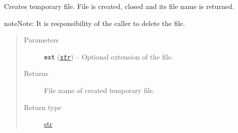 \documentclass[a4paper,10pt,english]{sphinxmanual}
\begin{document}
\begin{fulllineitems}
\label{aqueduct.utils.helpers:aqueduct.utils.helpers.create_tmpfile}
Creates temporary file. File is created, closed and its file name is returned.

\begin{notice}{note}{Note:}
It is responsibility of the caller to delete the file.
\end{notice}
\begin{quote}\begin{description}
\item[{Parameters}] \leavevmode
\textbf{\texttt{ext}} (\href{http://docs.python.org/2/library/functions.html\#str}{\emph{\texttt{str}}}) -- Optional extension of the file.

\item[{Returns}] \leavevmode
File name of created temporary file.

\item[{Return type}] \leavevmode
\href{http://docs.python.org/2/library/functions.html\#str}{str}

\end{description}\end{quote}

\end{fulllineitems}

\end{document}
